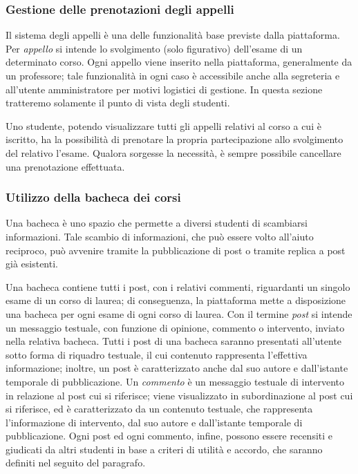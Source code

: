 \documentclass [a4paper,11pt]{book}
\begin{document}
\medskip

\subsubsection{Gestione delle prenotazioni degli appelli}

Il sistema degli appelli è una delle funzionalità base previste dalla piattaforma. Per \emph{appello} si intende lo svolgimento (solo figurativo) dell'esame di un determinato corso. Ogni appello viene inserito nella piattaforma, generalmente da un professore; tale funzionalità in ogni caso è accessibile anche alla segreteria e all'utente amministratore per motivi logistici di gestione. In questa sezione tratteremo solamente il punto di vista degli studenti.

Uno studente, potendo visualizzare tutti gli appelli relativi al corso a cui è iscritto, ha la possibilità di prenotare la propria partecipazione allo svolgimento del relativo l'esame. Qualora sorgesse la necessità, è sempre possibile cancellare una prenotazione effettuata.

\medskip

\subsubsection{Utilizzo della bacheca dei corsi}

Una bacheca è uno spazio che permette a diversi studenti di scambiarsi informazioni. Tale scambio di informazioni, che può essere volto all'aiuto reciproco, può avvenire tramite la pubblicazione di post o tramite replica a post già esistenti.

Una bacheca contiene tutti i post, con i relativi commenti, riguardanti un singolo esame di un corso di laurea; di conseguenza, la piattaforma mette a disposizione una bacheca per ogni esame di ogni corso di laurea. Con il termine \emph{post} si intende un messaggio testuale, con funzione di opinione, commento o intervento, inviato nella relativa bacheca. Tutti i post di una bacheca saranno presentati all'utente sotto forma di riquadro testuale, il cui contenuto rappresenta l'effettiva informazione; inoltre, un post è caratterizzato anche dal suo autore e dall'istante temporale di pubblicazione. Un \emph{commento} è un messaggio testuale di intervento in relazione al post cui si riferisce; viene visualizzato in subordinazione al post cui si riferisce, ed è caratterizzato da un contenuto testuale, che rappresenta l'informazione di intervento, dal suo autore e dall'istante temporale di pubblicazione. Ogni post ed ogni commento, infine, possono essere recensiti e giudicati da altri studenti in base a criteri di utilità e accordo, che saranno definiti nel seguito del paragrafo.
\end{document}
